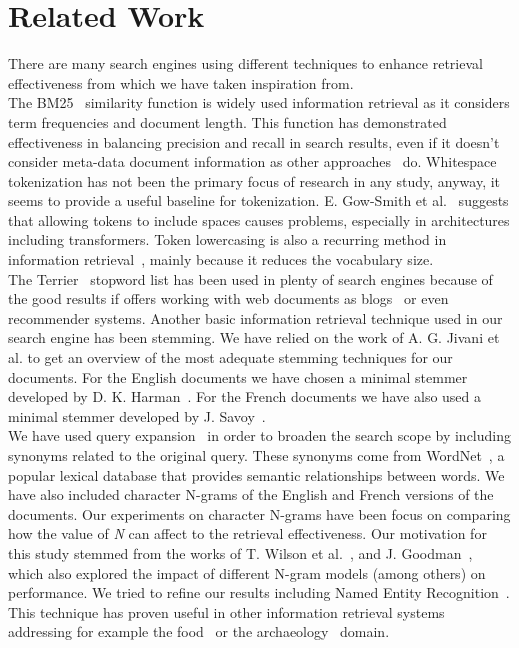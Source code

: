 \section{Related Work}
\label{sec:related}

There are many search engines using different techniques to enhance retrieval effectiveness from which we have taken
inspiration from.\\

The BM25~\cite{BM25} similarity function is widely used information retrieval as it considers term frequencies and
document length.
This function has demonstrated effectiveness in balancing precision and recall in search results, even if it
doesn't consider meta-data document information as other approaches~\cite{robertson2009probabilistic} do.
Whitespace tokenization has not been the primary focus of research in any study, anyway, it seems to provide a useful
baseline for tokenization.
E. Gow-Smith et al.~\cite{gowsmith2022improving} suggests that allowing tokens to include spaces causes problems,
especially in architectures including transformers.
Token lowercasing is also a recurring method in information retrieval~\cite{manning2008introduction}, mainly because it
reduces the vocabulary size.\\

The Terrier~\cite{OunisEtAl2006} stopword list has been used in plenty of search engines because of the good results if
offers working with web documents as blogs~\cite{ounis2009overview} or even recommender systems.
Another basic information retrieval technique used in our search engine has been stemming.
We have relied on the work of A. G. Jivani et al.\cite{jivani2011comparative} to get an overview of the most adequate
stemming techniques for our documents.
For the English documents we have chosen a minimal stemmer developed by D. K. Harman~\cite{Harman1991HowEI}.
For the French documents we have also used a minimal stemmer developed by J. Savoy~\cite{frenchStemmer}.\\

We have used query expansion~\cite{efthimiadis1996query} in order to broaden the search scope by including synonyms
related to the original query.
These synonyms come from WordNet~\cite{Fellbaum1998}, a popular lexical database that provides semantic relationships
between words.
We have also included character N-grams of the English and French versions of the documents.
Our experiments on character N-grams have been focus on comparing how the value of \textit{N} can affect to the
retrieval effectiveness.
Our motivation for this study stemmed from the works of T. Wilson et al.~\cite{wilson2008comparing}, and J.
Goodman~\cite{goodman2001bit}, which also explored the impact of different N-gram models (among others) on performance.
We tried to refine our results including Named Entity Recognition~\cite{mohit2014named}.
This technique has proven useful in other information retrieval systems addressing for example the
food~\cite{popovski2020survey} or the archaeology~\cite{brandsen2022can} domain.\\

